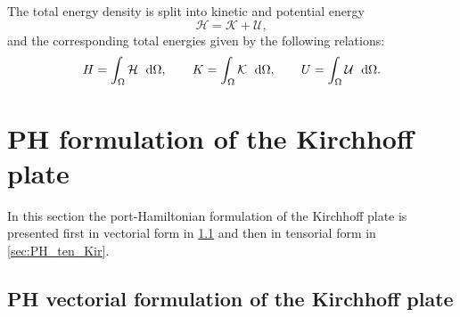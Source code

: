 \documentclass[preprint,12pt]{elsarticle}
\begin{document}
The total energy density is split into kinetic and potential energy
\begin{equation}
\mathcal{H} = \mathcal{K} + \mathcal{U},
\end{equation}
and the corresponding total energies given by the following relations:
\begin{equation}
H = \int_{\Omega} \mathcal{H} \ \d{\Omega}, \qquad K = \int_{\Omega} \mathcal{K} \ \d{\Omega}, \qquad U = \int_{\Omega} \mathcal{U} \ \d{\Omega}.
\end{equation}


\section{PH formulation of the Kirchhoff plate}
In this section the port-Hamiltonian formulation of the Kirchhoff plate is presented first in vectorial form  in \ref{sec:PH_vec_Kir} and then in tensorial form in \ref{sec:PH_ten_Kir}.

\subsection{PH vectorial formulation of the Kirchhoff plate}
\label{sec:PH_vec_Kir}
\end{document}
